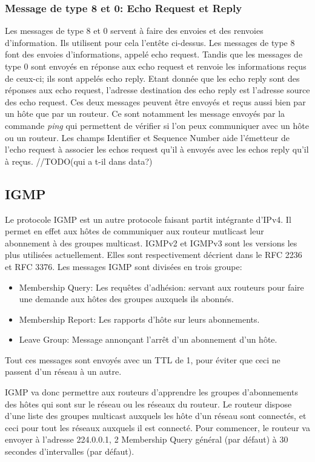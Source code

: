 \subsubsection{Message de type 8 et 0: Echo Request et Reply} Les messages de type 8 et 0 servent à
faire des envoies et des renvoies d'information. Ils utilisent pour cela
l'entête ci-dessus. Les messages de type 8 font des envoies d'informations,
appelé echo request. Tandis que les messages de type 0 sont envoyés en réponse
aux echo request et renvoie les informations reçus de ceux-ci; ils sont appelés
echo reply. Etant donnée que les echo reply sont des réponses aux echo request,
l'adresse destination des echo reply est l'adresse source des echo request. Ces
deux messages peuvent être envoyés et reçus aussi bien par un hôte que par un
routeur. Ce sont notamment les message envoyés par la commande {\it ping} qui
permettent de vérifier si l'on peux communiquer avec un hôte ou un routeur.  Les
champs Identifier et Sequence Number aide l'émetteur de l'echo request à
associer les echos request qu'il à envoyés avec les echos reply qu'il à reçus.
//TODO(qui a t-il dans data?)

\subsection{IGMP}
Le protocole IGMP est un autre protocole faisant partit intégrante d'IPv4. Il permet en effet aux hôtes
de communiquer aux routeur mutlicast leur abonnement à des groupes multicast.
IGMPv2 et IGMPv3 sont les versions les plus utilisées actuellement. Elles sont
respectivement décrient dans le RFC 2236 et RFC 3376.
Les messages IGMP sont divisées en trois groupe:
\begin{itemize}
\item Membership Query: Les requêtes d'adhésion: servant aux routeurs pour faire
une demande aux hôtes des groupes auxquels ils abonnés.
\item Membership Report: Les rapports d'hôte sur leurs abonnements.
\item Leave Group: Message annonçant l'arrêt d'un abonnement d'un hôte.
\end{itemize}
Tout ces messages sont envoyés avec un TTL de 1, pour éviter que ceci ne passent
d'un réseau à un autre.

IGMP va donc permettre aux routeurs d'apprendre les groupes d'abonnements des hôtes qui
sont sur le réseau ou les réseaux du routeur.
Le routeur dispose d'une liste des groupes multicast auxquels les hôte d'un réseau sont connectés,
et ceci pour tout les réseaux auxquels il est connecté.
Pour commencer, le routeur va envoyer à l'adresse 224.0.0.1, 2 Membership Query général
(par défaut) à 30 secondes d'intervalles (par défaut).

